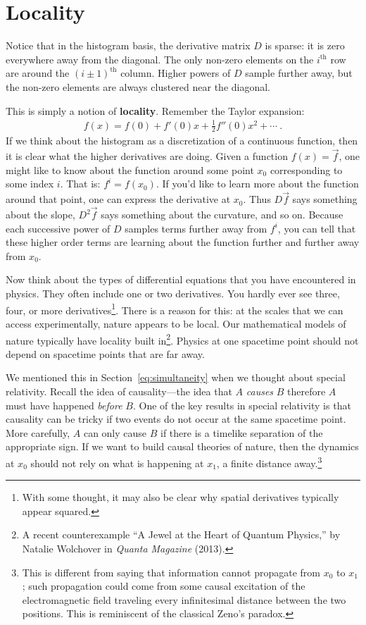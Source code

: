 \section{Locality}
\label{sec:locality}

Notice that in the histogram basis, the derivative matrix $D$ is sparse: it is zero everywhere away from the diagonal. The only non-zero elements on the $i^\text{th}$ row are around the $(i\pm 1)^\text{th}$ column.  Higher powers of $D$ sample further away, but the non-zero elements are always clustered near the diagonal.

This is simply a notion of \textbf{locality}. Remember the Taylor expansion:
\begin{align}
  f(x) = f(0) + f'(0) x + \frac{1}{2} f''(0)x^2 + \cdots \ .
\end{align}
If we think about the histogram as a discretization of a continuous function, then it is clear what the higher derivatives are doing. Given a function $f(x) = \vec{f}$, one might like to know about the function around some point $x_0$ corresponding to some index $i$. That is: $f^i = f(x_0)$. If you’d like to learn more about the function around that point, one can express the derivative at $x_0$. Thus $D\vec{f}$ says something about the slope, $D^2\vec{f}$ says something about the curvature, and so on. Because each successive power of $D$ samples terms further away from $f^i$, you can tell that these higher order terms are learning about the function further and further away from $x_0$. 

Now think about the types of differential equations that you have encountered in physics. They often include one or two derivatives. You hardly ever see three, four, or more derivatives\footnote{With some thought, it may also be clear why spatial derivatives typically appear squared.}. There is a reason for this: at the scales that we can access experimentally, nature appears to be local. Our mathematical models of nature typically have locality built in\footnote{A recent counterexample ``A Jewel at the Heart of Quantum Physics,'' by Natalie Wolchover in \emph{Quanta Magazine} (2013).
}. Physics at one spacetime point should not depend on spacetime points that are far away. 

We mentioned this in Section~\ref{eq:simultaneity} when we thought about special relativity. Recall the idea of causality---the idea that $A$ \emph{causes} $B$ therefore $A$ must have happened \emph{before} $B$. One of the key results in special relativity is that causality can be tricky if two events do not occur at the same spacetime point. More carefully, $A$ can only cause $B$ if there is a timelike separation of the appropriate sign.  If we want to build causal theories of nature, then the dynamics at $x_0$ should not rely on what is happening at $x_1$, a finite distance away.\footnote{This is different from saying that information cannot propagate from $x_0$ to $x_1$; such propagation could come from some causal excitation of the electromagnetic field traveling every infinitesimal distance between the two positions. This is reminiscent of the classical Zeno's paradox.}

